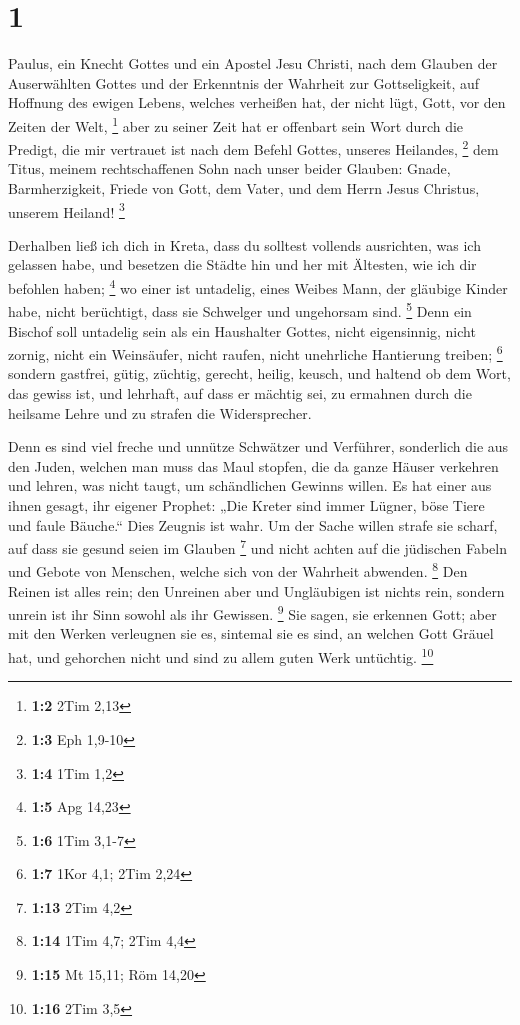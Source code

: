 \hypertarget{section}{%
\section{1}\label{section}}

 Paulus, ein Knecht Gottes und ein Apostel Jesu Christi,
nach dem Glauben der Auserwählten Gottes und der Erkenntnis der Wahrheit
zur Gottseligkeit,  auf Hoffnung des ewigen Lebens,
welches verheißen hat, der nicht lügt, Gott, vor den Zeiten der Welt,
\footnote{\textbf{1:2} 2Tim 2,13}  aber zu seiner Zeit hat
er offenbart sein Wort durch die Predigt, die mir vertrauet ist nach dem
Befehl Gottes, unseres Heilandes, \footnote{\textbf{1:3} Eph 1,9-10}
 dem Titus, meinem rechtschaffenen Sohn nach unser beider
Glauben: Gnade, Barmherzigkeit, Friede von Gott, dem Vater, und dem
Herrn Jesus Christus, unserem Heiland! \footnote{\textbf{1:4} 1Tim 1,2}

 Derhalben ließ ich dich in Kreta, dass du solltest
vollends ausrichten, was ich gelassen habe, und besetzen die Städte hin
und her mit Ältesten, wie ich dir befohlen haben; \footnote{\textbf{1:5}
  Apg 14,23}  wo einer ist untadelig, eines Weibes Mann,
der gläubige Kinder habe, nicht berüchtigt, dass sie Schwelger und
ungehorsam sind. \footnote{\textbf{1:6} 1Tim 3,1-7}  Denn
ein Bischof soll untadelig sein als ein Haushalter Gottes, nicht
eigensinnig, nicht zornig, nicht ein Weinsäufer, nicht raufen, nicht
unehrliche Hantierung treiben; \footnote{\textbf{1:7} 1Kor 4,1; 2Tim
  2,24}  sondern gastfrei, gütig, züchtig, gerecht,
heilig, keusch,  und haltend ob dem Wort, das gewiss ist,
und lehrhaft, auf dass er mächtig sei, zu ermahnen durch die heilsame
Lehre und zu strafen die Widersprecher.

 Denn es sind viel freche und unnütze Schwätzer und
Verführer, sonderlich die aus den Juden,  welchen man
muss das Maul stopfen, die da ganze Häuser verkehren und lehren, was
nicht taugt, um schändlichen Gewinns willen.  Es hat
einer aus ihnen gesagt, ihr eigener Prophet: „Die Kreter sind immer
Lügner, böse Tiere und faule Bäuche.``  Dies Zeugnis ist
wahr. Um der Sache willen strafe sie scharf, auf dass sie gesund seien
im Glauben \footnote{\textbf{1:13} 2Tim 4,2}  und nicht
achten auf die jüdischen Fabeln und Gebote von Menschen, welche sich von
der Wahrheit abwenden. \footnote{\textbf{1:14} 1Tim 4,7; 2Tim 4,4}
 Den Reinen ist alles rein; den Unreinen aber und
Ungläubigen ist nichts rein, sondern unrein ist ihr Sinn sowohl als ihr
Gewissen. \footnote{\textbf{1:15} Mt 15,11; Röm 14,20} 
Sie sagen, sie erkennen Gott; aber mit den Werken verleugnen sie es,
sintemal sie es sind, an welchen Gott Gräuel hat, und gehorchen nicht
und sind zu allem guten Werk untüchtig. \footnote{\textbf{1:16} 2Tim 3,5}

